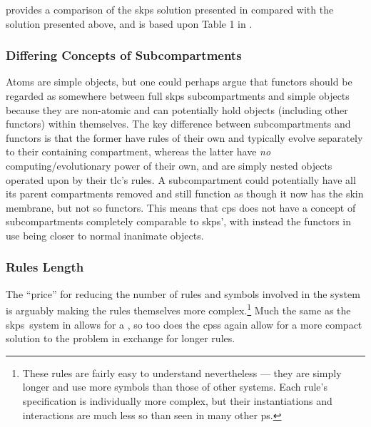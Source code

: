  provides a comparison of the \gls{skps} solution presented in \cite{Gheorghe2013} compared with the solution presented above, and is based upon Table 1 in \cite{Gheorghe2013}.  

\subsubsection{\label{sec:gcol:diffsubcomp}Differing Concepts of Subcompartments}
Atoms are simple objects, but one could perhaps argue that \glspl{functor} should be regarded as somewhere between full \gls{skps} subcompartments and simple objects because they are non-atomic and can potentially hold objects (including other \glspl{functor}) within themselves.  The key difference between subcompartments and \glspl{functor} is that the former have rules of their own and typically evolve separately to their containing \gls{compartment}, whereas the latter have \emph{no} computing/evolutionary power of their own, and are simply nested objects operated upon by their \gls{tlc}'s rules.  A subcompartment could potentially have all its parent \glspl{compartment} removed and still function as though it now has the skin membrane, but not so \glspl{functor}.  This means that \gls{cps} does not have a concept of subcompartments completely comparable to \gls{skps}', with instead the \glspl{functor} in use being closer to normal inanimate objects.

\subsubsection{Rules Length}
The ``price'' for reducing the number of rules and symbols involved in the system is arguably making the rules themselves more complex.\footnote{These rules are fairly easy to understand nevertheless --- they are simply longer and use more symbols than those of other systems.  Each rule's specification is individually more complex, but their instantiations and interactions are much less so than seen in many other \gls{ps}.}  Much the same as the \gls{skps}~system in \cite{Gheorghe2013} allows for a , so too does the \glspl{cps} again allow for a more compact solution to the problem in exchange for longer rules.

